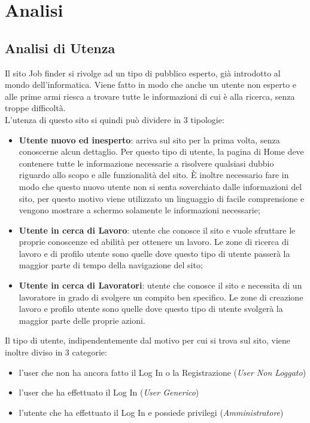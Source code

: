 \section{Analisi}
	
  \subsection{Analisi di Utenza}	
	  Il sito Job finder si rivolge ad un tipo di pubblico esperto, già introdotto al mondo dell’informatica. Viene fatto in modo che anche un utente non esperto e alle prime 
    armi riesca a trovare tutte le informazioni di cui è alla ricerca, senza troppe difficoltà.\\	
    L’utenza di questo sito si quindi può dividere in 3 tipologie:
	  \begin{itemize}
      \item \textbf{Utente nuovo ed inesperto}: arriva sul sito per la prima volta, senza conoscerne alcun dettaglio. Per questo tipo di utente, la pagina di Home deve contenere tutte 
      le informazione necessarie a risolvere qualsiasi dubbio riguardo allo scopo e alle funzionalità del sito. È inoltre necessario fare in modo che questo nuovo utente non si
      senta soverchiato dalle informazioni del sito, per questo motivo viene utilizzato un linguaggio di facile comprensione e vengono mostrare a schermo solamente le 
      informazioni necessarie;
      \item \textbf{Utente in cerca di Lavoro}: utente che conosce il sito e vuole sfruttare le proprie conoscenze ed abilità per ottenere un lavoro. Le zone di ricerca di lavoro e di profilo utente 
      sono quelle dove questo tipo di utente passerà la maggior parte di tempo della navigazione del sito;
      \item \textbf{Utente in cerca di Lavoratori}: utente che conosce il sito e necessita di un lavoratore in grado di svolgere un compito ben specifico. Le zone di creazione lavoro 
      e profilo utente sono quelle dove questo tipo di utente svolgerà la maggior parte delle proprie azioni.
    \end{itemize}
    Il tipo di utente, indipendentemente dal motivo per cui si trova sul sito, viene inoltre diviso in 3 categorie:
    \begin{itemize} 
      \item l’user che non ha ancora fatto il Log In o la Registrazione (\textit{User Non Loggato})
      \item l’user che ha effettuato il Log In (\textit{User Generico}) 
      \item l’utente che ha effettuato il Log In e possiede privilegi (\textit{Amministratore})
    \end{itemize}

